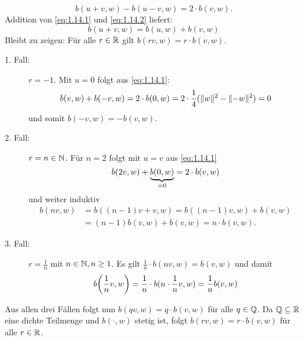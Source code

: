 \begin{beweis}
\begin{description}
\begin{itemize}
\begin{equation}
				b(u+v,w) - b(u-v,w) = 2 \cdot b(v,w). \label{eq:1.14.2}
			\end{equation}
			Addition von \eqref{eq:1.14.1} und \eqref{eq:1.14.2} liefert:
			\[ b(u+v,w) = b(u,w) + b(v,w) \]
			Bleibt zu zeigen: Für alle $r \in \mathbb{R}$ gilt $b(rv,w) = r\cdot b(v,w)$.
			\begin{description}
				\item[1. Fall:] $r=-1$.
				Mit $u = 0$ folgt aus \eqref{eq:1.14.1}:
				\[
					b(v,w) + b(-v,w) = 2 \cdot b(0,w) = 2 \cdot \frac{1}{4} (\lVert w\rVert^2 - \lVert-w\rVert^2) = 0
				\]
				und somit $b(-v,w) = -b(v,w)$.
				\item[2. Fall:] $r = n \in \mathbb{N}$.
				Für $n = 2$ folgt mit $u = v$ aus \eqref{eq:1.14.1}
				\[
					b(2v,w) + {\underbrace{b(0,w)}_{=0}} = 2 \cdot b(v,w)
				\]
				und weiter induktiv
				\begin{align*}
					b(nv,w) &= b((n-1)v + v,w) = b((n-1)v,w) + b(v,w) \\
					&= (n-1) b(v,w) + b(v,w) = n\cdot b(v,w).
				\end{align*}
				\item[3. Fall:] $r = \frac{1}{n}$ mit $n \in \mathbb{N}, n \geq 1$.
				Es gilt $\frac{1}{n} \cdot b(nv,w) = b(v,w)$ und damit
				\[
					b\enbrace*{\frac{1}{n} v,w} = \frac{1}{n} \cdot b(n \cdot \frac{1}{n}v,w) = \frac{1}{n} b(v,w)
				\] 
			\end{description}
			Aus allen drei Fällen folgt nun $b(qv,w) = q\cdot b(v,w)$ für alle $q \in \mathbb{Q}$. Da $\mathbb{Q} \subseteq \mathbb{R}$ eine dichte Teilmenge und $b(\cdot,w)$ stetig ist, folgt $b(rv,w) = r \cdot b(v,w)$ für alle $r \in \mathbb{R}$.
		\end{itemize}
	\end{description}
\end{beweis}

